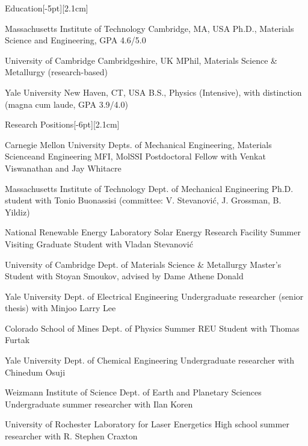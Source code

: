 \documentclass{cv} %
\begin{document}
\thispagestyle{empty}
\begin{cvSection}{Education}[-5pt][2.1cm]

     {Massachusetts Institute of Technology}
     {Cambridge, MA, USA}
     {Ph.D., Materials Science and Engineering, GPA 4.6/5.0}

     {University of Cambridge}
     {Cambridgeshire, UK}
     {MPhil, Materials Science \& Metallurgy (research-based)}

     {Yale University}
     {New Haven, CT, USA}
     {B.S., Physics (Intensive), with distinction (magna cum laude, GPA 3.9/4.0)}


\end{cvSection}

\vspace{-2mm}
\begin{cvSection}{Research Positions}[-6pt][2.1cm]

    {Carnegie Mellon University}
    {Depts. of Mechanical Engineering, Materials Science\newline and Engineering}
    {MFI, MolSSI Postdoctoral Fellow with Venkat Viswanathan and Jay Whitacre}

    {Massachusetts Institute of Technology}
    {Dept. of Mechanical Engineering}
    {Ph.D. student with Tonio Buonassisi (committee: V. Stevanovi\'c, J. Grossman, B. Yildiz)}

    {National Renewable Energy Laboratory}
    {Solar Energy Research Facility}
    {Summer Visiting Graduate Student with Vladan Stevanovi\'c}

    {University of Cambridge}
    {Dept. of Materials Science \& Metallurgy}
    {Master's Student with Stoyan Smoukov, advised by Dame Athene Donald}

    {Yale University}
    {Dept. of Electrical Engineering}
    {Undergraduate researcher (senior thesis) with Minjoo Larry Lee}

    {Colorado School of Mines}
    {Dept. of Physics}
    {Summer REU Student with Thomas Furtak}

    {Yale University}
    {Dept. of Chemical Engineering}
    {Undergraduate researcher with Chinedum Osuji}

    {Weizmann Institute of Science}
    {Dept. of Earth and Planetary Sciences}
    {Undergraduate summer researcher with Ilan Koren}

    {University of Rochester}
    {Laboratory for Laser Energetics}
    {High school summer researcher with R. Stephen Craxton}

\end{cvSection}
\end{document}
